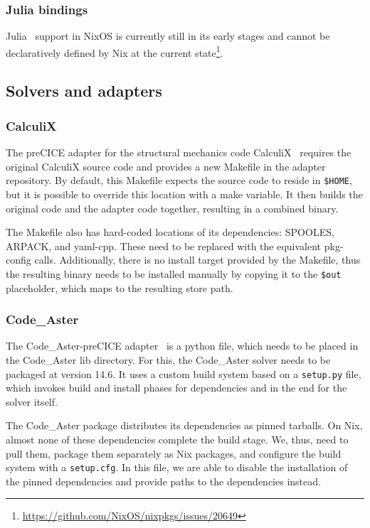 \documentclass{eceasst}
\begin{document}
\subsubsection{Julia bindings}

Julia~\cite{bezanson2017julia} support in NixOS is currently still in its early stages and cannot be declaratively defined by Nix at the current state\footnote{\url{https://github.com/NixOS/nixpkgs/issues/20649}}.

\subsection{Solvers and adapters}

\subsubsection{CalculiX}

The preCICE adapter for the structural mechanics code CalculiX~\cite{Uekermann2017_Adapters} requires the original CalculiX source code and provides a new Makefile in the adapter repository.
By default, this Makefile expects the source code to reside in \texttt{\$HOME}, but it is possible to override this location with a make variable.
It then builds the original code and the adapter code together, resulting in a combined binary.

The Makefile also has hard-coded locations of its dependencies: SPOOLES, ARPACK, and yaml-cpp. These need to be replaced with the equivalent pkg-config calls.
Additionally, there is no install target provided by the Makefile, thus the resulting binary needs to be installed manually by copying it to the \texttt{\$out} placeholder, which maps to the resulting store path.

\subsubsection{Code\_Aster}

The Code\_Aster-preCICE adapter~\cite{Uekermann2017_Adapters} is a python file, which needs to be placed in the Code\_Aster lib directory.
For this, the Code\_Aster solver needs to be packaged at version 14.6.
It uses a custom build system based on a \texttt{setup.py} file, which invokes build and install phases for dependencies and in the end for the solver itself.

The Code\_Aster package distributes its dependencies as pinned tarballs.
On Nix, almost none of these dependencies complete the build stage. We, thus, need to pull them, package them separately as Nix packages, and configure the build system with a \texttt{setup.cfg}.
In this file, we are able to disable the installation of the pinned dependencies and provide paths to the dependencies instead.
\end{document}

